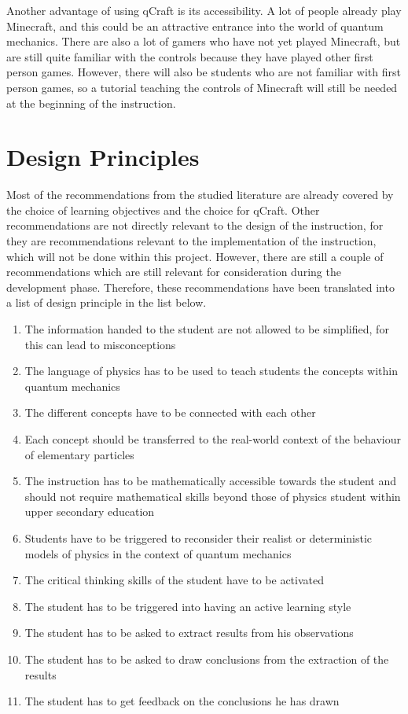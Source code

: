 \documentclass[11pt,twoside]{report} %
\begin{document}
Another advantage of using qCraft is its accessibility. A lot of people already play Minecraft, and this could be an attractive entrance into the world of quantum mechanics. There are also a lot of gamers who have not yet played Minecraft, but are still quite familiar with the controls because they have played other first person games. However, there will also be students who are not familiar with first person games, so a tutorial teaching the controls of Minecraft will still be needed at the beginning of the instruction.

\section{Design Principles}

Most of the recommendations from the studied literature are already covered by the choice of learning objectives and the choice for qCraft. Other recommendations are not directly relevant to the design of the instruction, for they are recommendations relevant to the implementation of the instruction, which will not be done within this project. However, there are still a couple of recommendations which are still relevant for consideration during the development phase. Therefore, these recommendations have been translated into a list of design principle in the list below.

\begin{enumerate}
\item \label{itm:simple}The information handed to the student are not allowed to be simplified, for this can lead to misconceptions
\item \label{itm:language} The language of physics has to be used to teach students the concepts within quantum mechanics
\item \label{itm:links}The different concepts have to be connected with each other
\item \label{itm:realworld}Each concept should be transferred to the real-world context of the behaviour of elementary particles
\item \label{itm:maths}The instruction has to be mathematically accessible towards the student and should not require mathematical skills beyond those of physics student within upper secondary education
\item \label{itm:models}Students have to be triggered to reconsider their realist or deterministic models of physics in the context of quantum mechanics
\item \label{itm:critic}The critical thinking skills of the student have to be activated
\item \label{itm:active}The student has to be triggered into having an active learning style
\item \label{itm:results}The student has to be asked to extract results from his observations
\item \label{itm:conclusions}The student has to be asked to draw conclusions from the extraction of the results
\item \label{itm:feedback}The student has to get feedback on the conclusions he has drawn
\end{enumerate}
\end{document}
